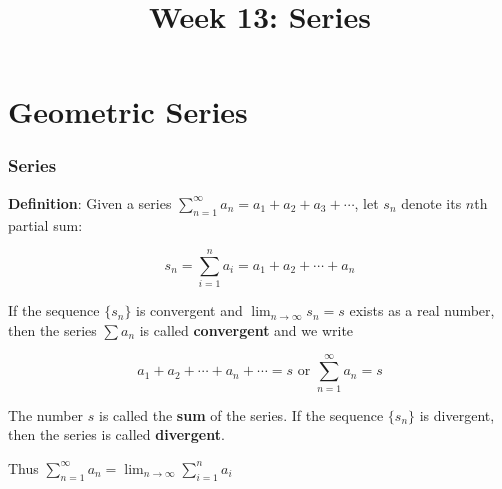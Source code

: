 \documentclass[t]{beamer}
\title{Week 13: Series}
\theoremstyle{plain}
\theoremstyle{definition}
\newcommand{\limm}[1]{\displaystyle \lim_{n\to #1}}
\begin{document}
\frame{\titlepage}

\setcounter{tocdepth}{2}
\frame{\tableofcontents

}


\section{Geometric Series}

\begin{frame}
\footnotesize
\frametitle{Series}

\textbf{Definition}: Given a series $\displaystyle\sum_{n=1}^{\infty} a_n = a_1 + a_2 + a_3 + \cdots$,  let $s_n$ denote its $n$th partial sum:

$$s_n = \sum_{i=1}^{n}a_i = a_1 + a_2 + \cdots + a_n$$

If the sequence $\{s_n\}$ is convergent and $\limm{\infty} s_n = s$ exists as a real number, then the series $\sum a_n$ is called \textbf{convergent} and we write

$$a_1 + a_2 + \cdots + a_n + \cdots = s \text{  or  } \sum_{n=1}^{\infty} a_n = s$$

The number $s$ is called the \textbf{sum} of the series.  If the sequence $\{s_n\}$ is divergent, then the series is called \textbf{divergent}.

\medskip

Thus $\displaystyle\sum_{n=1}^{\infty} a_n = \limm{\infty} \sum_{i=1}^{n} a_i$

\end{frame}
\end{document}
